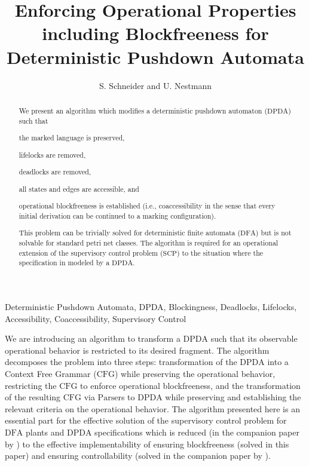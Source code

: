 \documentclass[draft]{ifacconf}
\newcommand{\Parser}{\ensuremath{\mathrm{Parser}}\xspace}
\newcommand{\CFG}{\ensuremath{\mathrm{CFG}}\xspace}
\newcommand{\SCP}{\ensuremath{\mathrm{SCP}}\xspace}
\newcommand{\DFA}{\ensuremath{\mathrm{DFA}}\xspace}
\newcommand{\DPDA}{\ensuremath{\mathrm{DPDA}}\xspace}
\newcommand{\OBF}{operational blockfree\xspace}
\begin{document}
\def\abstractname{{\bfseries {Abstract: }}}
\def\figurename{\bfseries\footnotesize Figure}
\def\tablename{\bfseries\footnotesize Table}
\begin{frontmatter}
\title{Enforcing Operational Properties\\including Blockfreeness for\\Deterministic Pushdown Automata}

\author{S. Schneider and U. Nestmann}

\address{Technische Universität Berlin}
\begin{abstract}
We present an algorithm which modifies a deterministic pushdown automaton (\DPDA) such that
\begin{inparaenum}[(i)]\item the marked language is preserved, \item lifelocks are removed, \item deadlocks are removed, \item all states and edges are accessible, and \item \OBF{}ness is established (i.e., coaccessibility in the sense that every initial derivation can be continued to a marking configuration). \end{inparaenum}
This problem can be trivially solved for deterministic finite automata (\DFA) but is not solvable for standard petri net classes.
The algorithm is required for an operational extension of the supervisory control problem (\SCP) to the situation where the specification in modeled by a \DPDA.
\end{abstract}

\begin{keyword}
Deterministic Pushdown Automata, DPDA, Blockingness, Deadlocks, Lifelocks, Accessibility, Coaccessibility, Supervisory Control
\end{keyword}


\end{frontmatter}

We are introducing an algorithm to transform a \DPDA such that its observable operational behavior is restricted to its desired fragment.
The algorithm decomposes the problem into three steps: transformation of the \DPDA into a Context Free Grammar (\CFG) while preserving the operational behavior, restricting the \CFG to enforce operational blockfreeness, and the transformation of the resulting \CFG via \Parser{}s to \DPDA while preserving and establishing the relevant criteria on the operational behavior.
The algorithm presented here is an essential part for the effective solution of the supervisory control problem for \DFA plants and \DPDA specifications which is reduced (in the companion paper by \citet*{SchneiderSchmuck2014}) to the effective implementability of ensuring blockfreeness (solved in this paper) and ensuring controllability (solved in the companion paper by \citet*{SchmuckSchneider2014}).
\end{document}
